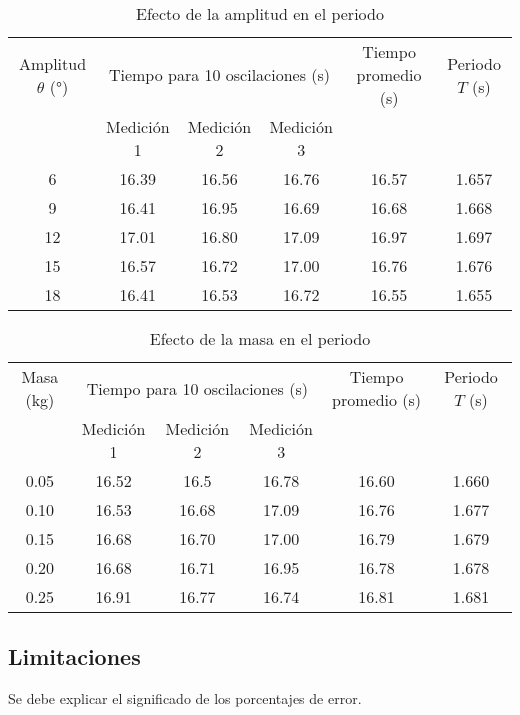 \documentclass[twocolumn]{report}
\numberwithin{table}{section}
\begin{document}
\begin{table}[ht]
  \centering
  \begin{tabular}{cccccc}
    \toprule
    Amplitud $\theta$ (°) & \multicolumn{3}{c}{Tiempo para 10
    oscilaciones (s)} & Tiempo promedio (s) & Periodo $T$ (s) \\
    \cmidrule(lr){2-4}
    & Medición 1 & Medición 2 & Medición 3 &  &  \\
    \midrule
    6   & 16.39 & 16.56 & 16.76 & 16.57 & 1.657 \\
    9   & 16.41 & 16.95 & 16.69 & 16.68 & 1.668 \\
    12  & 17.01 & 16.80 & 17.09 & 16.97 & 1.697 \\
    15  & 16.57 & 16.72 & 17.00 & 16.76 & 1.676 \\
    18  & 16.41 & 16.53 & 16.72 & 16.55 & 1.655 \\
    \bottomrule
  \end{tabular}
  \caption{Efecto de la amplitud en el periodo}\label{tab:amplitud_periodo}
\end{table}

\begin{table}[ht]
  \centering
  \begin{tabular}{cccccc}
    \toprule
    Masa (kg) & \multicolumn{3}{c}{Tiempo para 10 oscilaciones
    (s)} & Tiempo promedio (s) & Periodo $T$ (s) \\
    \cmidrule(lr){2-4}
    & Medición 1 & Medición 2 & Medición 3 &  &  \\
    \midrule
    0.05  & 16.52 & 16.5  & 16.78 & 16.60 & 1.660 \\
    0.10  & 16.53 & 16.68 & 17.09 & 16.76 & 1.677 \\
    0.15  & 16.68 & 16.70 & 17.00 & 16.79 & 1.679 \\
    0.20  & 16.68 & 16.71 & 16.95 & 16.78 & 1.678 \\
    0.25  & 16.91 & 16.77 & 16.74 & 16.81 & 1.681 \\
    \bottomrule
  \end{tabular}
  \caption{Efecto de la masa en el periodo}\label{tab:masa_periodo}
\end{table}

\twocolumn

\subsection{Limitaciones}

{\color{red}Se debe explicar el significado de los porcentajes de
error.}
\end{document}
